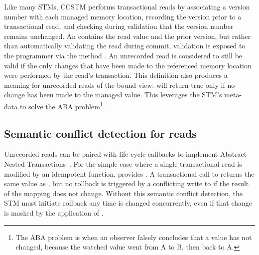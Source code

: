 Like many STMs, CCSTM performs transactional reads by associating a
version number with each managed memory location, recording the version
prior to a transactional read, and checking during validation that the
version number remains unchanged.  An  contains the
read value and the prior version, but rather than automatically validating
the read during commit, validation is exposed to the programmer via the
method .  An unrecorded read is considered to still be
valid if the only changes that have been made to the referenced memory
location were performed by the read's transaction.  This definition also
produces a meaning for unrecorded reads of the  bound view:
 will return true only if no change has been made to the
managed value.  This leverages the STM's meta-data to solve
the ABA problem\footnote{The ABA problem is when an observer falsely
concludes that a value has not changed, because the watched value went
from A to B, then back to A.}.

\subsection{Semantic conflict detection for reads}
\label{sec:map}

Unrecorded reads can be paired with life cycle callbacks to implement
Abstract Nested Transactions~\cite{harris07abstract}.  For the simple case where
a single transactional read is modified by an idempotent function, 
provides
\code{map[}\code{](f: }\code{ => }\code{): }.
A transactional call to
 returns the same value as , but no rollback
is triggered by a conflicting write to  if the result of the mapping
does not change.  Without this
semantic conflict detection, the STM must initiate rollback any time 
is changed concurrently, even if that change is masked by the application of
.

